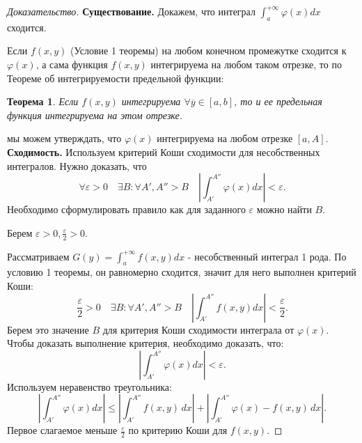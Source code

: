 \documentclass{article}
\theoremstyle{plain}
\newtheorem{theorem}{Теорема}
\theoremstyle{definition}
\theoremstyle{remark}
\begin{document}
\begin{proof}[Доказательство]
\textbf{Существование.} Докажем, что интеграл $\int_{a}^{+\infty} \varphi(x)dx$ сходится.

Если $f(x, y)$ (Условие 1 теоремы) на любом конечном промежутке сходится к $\varphi(x)$, а сама функция $f(x, y)$ интегрируема на любом таком отрезке, то по Теореме об интегрируемости предельной функции:

\begin{theorem}Если $f(x, y)$ интегрируема $\forall \overline{y} \in [a, b]$, то и ее предельная функция интегрируема на этом отрезке.
\end{theorem}
мы можем утверждать, что $\varphi(x)$ интегрируема на любом отрезке $[a, A]$. \\
\textbf{Сходимость.} Используем критерий Коши сходимости для несобственных интегралов. Нужно доказать, что
\[
\forall \varepsilon > 0 \quad \exists B : \forall A', A'' > B \quad 
\left| \int_{A'}^{A''} \varphi(x)dx \right| < \varepsilon.
\]
Необходимо сформулировать правило как для заданного $\varepsilon$ можно найти $B$.

Берем $\varepsilon > 0, \frac{\varepsilon}{2} > 0.$

Рассматриваем $G(y) = \int_{a}^{+\infty} f(x, y)dx$ - несобственный интеграл 1 рода. По условию 1 теоремы, он равномерно сходится, значит для него выполнен критерий Коши:
\[
\frac{\varepsilon}{2} > 0 \quad \exists B : \forall A', A'' > B \quad 
\left| \int_{A'}^{A''} f(x, y)dx \right| < \frac{\varepsilon}{2}.
\]
Берем это значение $B$ для критерия Коши сходимости интеграла от $\varphi(x)$. Чтобы доказать выполнение критерия, необходимо доказать, что:
\[
\left| \int_{A'}^{A''} \varphi(x)dx \right| < \varepsilon.
\]
Используем неравенство треугольника:
\[
\left| \int_{A'}^{A''} \varphi(x)dx \right| \leq
\left| \int_{A'}^{A''} f(x, y) \, dx \right| +
\left| \int_{A'}^{A''} \varphi(x) - f(x, y) \, dx \right|.
\]
Первое слагаемое меньше $\frac{\varepsilon}{2}$ по критерию Коши для $f(x, y)$.


\end{proof}
\end{document}
